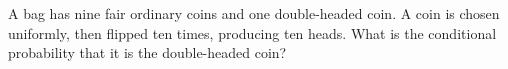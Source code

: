 A bag has nine fair ordinary coins and one double-headed coin. A coin is chosen uniformly, then flipped ten times, producing ten heads. What is the conditional probability that it is the double-headed coin?
